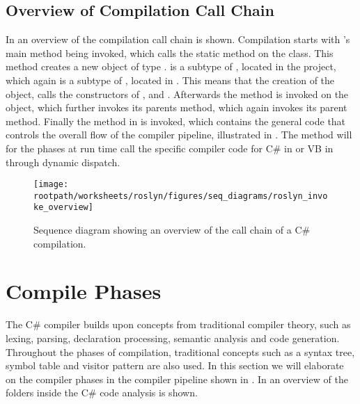 \subsection{Overview of Compilation Call Chain}\label{ssec:overview_chain}
In  an overview of the compilation call chain is shown. Compilation starts with 's main method being invoked, which calls the static  method on the  class. This method creates a new  object of type .  is a subtype of , located in the  project, which again is a subtype of , located in . This means that the creation of the  object, calls the constructors of ,  and . Afterwards the  method is invoked on the  object, which further invokes its parents  method, which again invokes its parent  method. Finally the  method in  is invoked, which contains the general code that controls the overall flow of the compiler pipeline, illustrated in . The  method will for the phases at run time call the specific compiler code for C\# in  or \ac{VB} in  through dynamic dispatch.

\begin{sidewaysfigure}[htbp]
\centering
 \texttt{[image: \\rootpath/worksheets/roslyn/figures/seq\_diagrams/roslyn\_invoke\_overview]} 
 \caption{Sequence diagram showing an overview of the call chain of a C\# compilation.}
\label{fig:roslyn_invoke_overview}
\end{sidewaysfigure}

\section{Compile Phases}\label{sec:compile_phases}
The C\# compiler builds upon concepts from traditional compiler theory, such as lexing, parsing, declaration processing, semantic analysis and code generation\cite{sebestaProLang}\cite{fischer2009crafting}. Throughout the phases of compilation, traditional concepts such as a syntax tree, symbol table and visitor pattern are also used. In this section we will elaborate on the compiler phases in the compiler pipeline shown in . In  an overview of the folders inside the C\# code analysis is shown.

